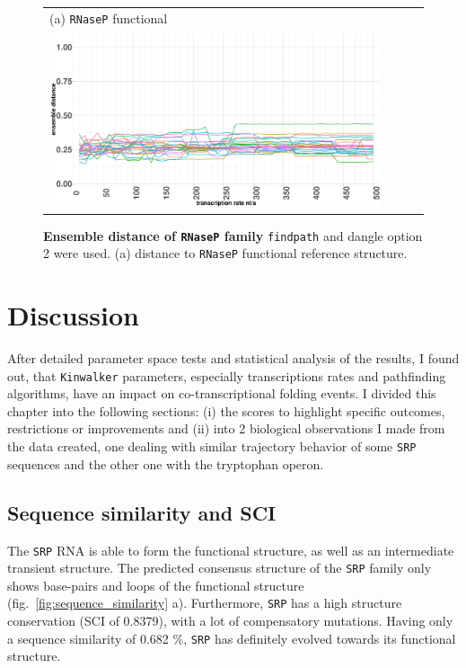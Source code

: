 \documentclass[ twoside,openright,titlepage,numbers=noenddot,headinclude,%
                footinclude=false, cleardoublepage=empty,abstractoff, %
                BCOR=5mm,paper=a4,fontsize=11pt,%
                ngerman,american,%
                ]{scrreprt}
\begin{document}
\begin{figure}
\begin{tabular}{l}
(a) \texttt{RNaseP} functional \\
\includegraphics[width=0.9\textwidth]{./pictures/ensembleDistance/ensembleDistance_RNAseP.pdf}\\
\end{tabular}
\caption{{\bf Ensemble distance of \texttt{RNaseP} family}
\texttt{findpath} and dangle option 2 were used.
(a) distance to \texttt{RNaseP} functional reference structure. 
}
\label{fig:ensembleDistanceRNAseP}
\end{figure}
	
	

\FloatBarrier				

\chapter{Discussion}


After detailed parameter space tests and statistical analysis of the
results, I found out, that \texttt{Kinwalker} parameters, especially
transcriptions rates and pathfinding algorithms, have an impact
on co-transcriptional folding events. I divided this chapter into the following
sections: (i) the scores to highlight specific outcomes, restrictions or
improvements and (ii) into 2 biological observations I made from the data
created, one dealing with similar trajectory behavior of some \texttt{SRP} sequences
and the other one with the tryptophan operon.

\section{Sequence similarity and SCI}


The \texttt{SRP} RNA is able to form the functional structure, as well as an intermediate transient structure.
The predicted consensus structure of the \texttt{SRP} family only shows base-pairs and loops of the functional structure (fig.~\ref{fig:sequence_similarity} a).
Furthermore, \texttt{SRP} has a high structure conservation (SCI of 0.8379), with a lot of compensatory mutations. Having only a sequence similarity of 0.682 \%, \texttt{SRP} has definitely evolved towards its functional structure. 
\end{document}
